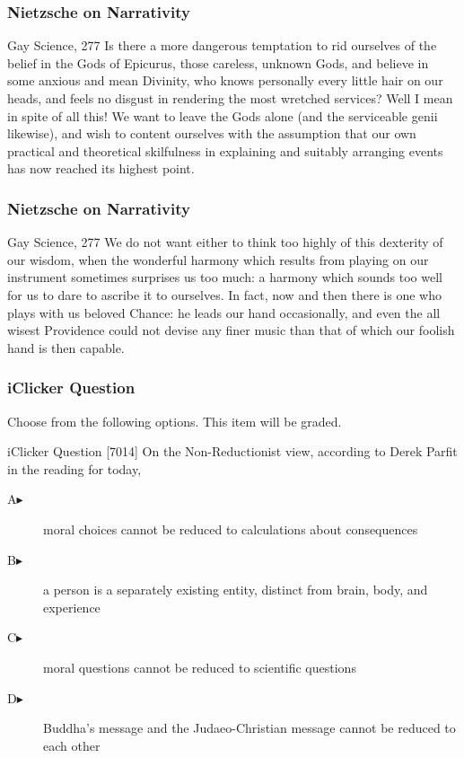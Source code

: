 \documentclass[xcolor=dvipsnames]{beamer}
\begin{document}
\begin{frame}
  \frametitle{Nietzsche on Narrativity}
  \begin{block}{Gay Science, 277}
    Is there a more dangerous temptation to rid ourselves of the
    belief in the Gods of Epicurus, those careless, unknown Gods, and
    believe in some anxious and mean Divinity, who knows personally
    every little hair on our heads, and feels no disgust in rendering
    the most wretched services? Well I mean in spite of all this! We
    want to leave the Gods alone (and the serviceable genii likewise),
    and wish to content ourselves with the assumption that our own
    practical and theoretical skilfulness in explaining and suitably
    arranging events has now reached its highest point.
  \end{block}
\end{frame}

\begin{frame}
  \frametitle{Nietzsche on Narrativity}
  \begin{block}{Gay Science, 277}
    We do not want either to think too highly of this dexterity of our
    wisdom, when the wonderful harmony which results from playing on
    our instrument sometimes surprises us too much: a harmony which
    sounds too well for us to dare to ascribe it to ourselves. In
    fact, now and then there is one who plays with us beloved Chance:
    he leads our hand occasionally, and even the all wisest Providence
    could not devise any finer music than that of which our foolish
    hand is then capable.
  \end{block}
\end{frame}

\begin{frame}
  \frametitle{iClicker Question}
Choose from the following options. This item will be graded.
\begin{block}{iClicker Question}
[7014] On the Non-Reductionist view, according to Derek Parfit in the reading for today,
\end{block}
\begin{description}
\item[A\hspace{.2in}$\blacktriangleright$] moral choices cannot be reduced to calculations about consequences
\item[B\hspace{.2in}$\blacktriangleright$] a person is a separately existing entity, distinct from brain, body, and experience
\item[C\hspace{.2in}$\blacktriangleright$] moral questions cannot be reduced to scientific questions
\item[D\hspace{.2in}$\blacktriangleright$] Buddha's message and the Judaeo-Christian message cannot be reduced to each other
\end{description}
\end{frame}
\end{document}
